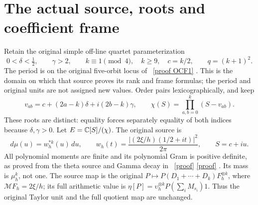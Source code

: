 \documentclass[11pt]{article}
\begin{document}
\section{The actual source, roots and coefficient frame}
Retain the original simple off-line quartet parameterization
\[
 0<\delta<\tfrac12,\qquad \gamma>2,\qquad
 k\equiv1\pmod4,\quad k\ge9,\quad c=k/2,
 \qquad q=(k+1)^2.
 \tag{MR1}
\]
The period is on the original five-orbit locus of \cite{mrroot:OCF}%
~\href{https://github.com/KokunoYumeto/zeta-function-research-reader/blob/5992ad50c0f2a06921f1fcaded7b4e38097c0739/workbenches/splitzero-tandem/continuations/20260920-original-kernel-mixed-determinants/providers/ORIGINAL_CONDUCTOR_STRIP_FRAME.tex\#L27}{[proof OCF1]}%
{}.
This is the domain on which that source proves its rank and frame
formulas; the period and original units are not assigned new values.
Order pairs lexicographically, and keep
\[
 v_{ab}=c+(2a-k)\delta+i(2b-k)\gamma,
 \qquad \chi(S)=\prod_{a,b=0}^k(S-v_{ab}).\tag{MR2}
\]
These roots are distinct: equality forces separately equality of both
indices because $\delta,\gamma>0$. Let $E=\mathbb C[S]/(\chi)$.
The original source is
\[
 d\mu(u)=w_h^{*k}(u)\,du,\qquad
 w_h(t)=\frac{|(2\xi/h)(1/2+it)|^2}{2\pi},\qquad S=c+iu.
 \tag{MR3}
\]
All polynomial moments are finite and its polynomial Gram is positive
definite, as proved from the theta source and Gamma decay in
\cite{mrroot:Toda,mrroot:Mixed}%
~\href{https://github.com/KokunoYumeto/zeta-function-research-reader/blob/5992ad50c0f2a06921f1fcaded7b4e38097c0739/workbenches/splitzero-tandem/continuations/20260920-original-kernel-mixed-determinants/providers/TODA_VOLUME_CONTROL.tex\#L1}{[proof]} \href{https://github.com/KokunoYumeto/zeta-function-research-reader/blob/5992ad50c0f2a06921f1fcaded7b4e38097c0739/workbenches/splitzero-tandem/continuations/20260920-original-kernel-mixed-determinants/MIXED_CONFLUENT_PROOF.tex\#L1}{[proof]}%
{}. Its mass is $\mu_h^k$, not one.
The source map is the original
$P\mapsto P(D_1+\cdots+D_k)F_h^{\otimes k}$, where
$\mathcal MF_h=2\xi/h$; its full arithmetic value is
$\eta[P]=\upsilon_h^{\otimes k}P(\sum_iM_{s_i})1$.
Thus the original Taylor unit and the full quotient map are unchanged.
\end{document}
